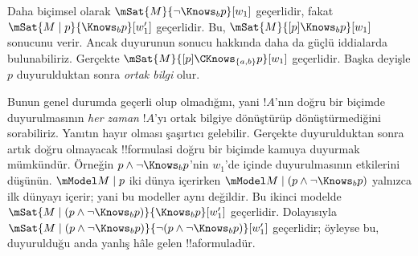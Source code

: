 Daha biçimsel olarak $\mSat{M}{\lnot \Knows_b p}[w_1]$ geçerlidir, fakat
$\mSat{M \mid p}{\Knows_b p}[w'_1]$ geçerlidir. Bu, $\mSat{M}{[p] \Knows_b
p}[w_1]$ sonucunu verir. Ancak duyurunun sonucu hakkında daha da güçlü
iddialarda bulunabiliriz. Gerçekte $\mSat{M}{[p]\CKnows_{\{a,b\}} p}[w_1]$
geçerlidir. Başka deyişle $p$ duyurulduktan sonra \emph{ortak bilgi} olur.

Bunun genel durumda geçerli olup olmadığını, yani $!A$'nın doğru bir biçimde
duyurulmasının \emph{her zaman} $!A$'yı ortak bilgiye dönüştürüp
dönüştürmediğini sorabiliriz. Yanıtın hayır olması şaşırtıcı gelebilir.
Gerçekte duyurulduktan sonra artık doğru olmayacak !!{formula}s{}i doğru bir
biçimde kamuya duyurmak mümkündür. Örneğin $p \land \lnot \Knows_b p$'nin
$w_1$'de  içinde duyurulmasının etkilerini
düşünün. $\mModel M \mid p$ iki dünya içerirken
$\mModel M \mid (p \land \lnot \Knows_b p)$ yalnızca ilk dünyayı içerir;
yani bu modeller aynı değildir. Bu ikinci modelde
$\mSat{M \mid (p \land \lnot \Knows_b p)}{\Knows_b p}[w'_1]$ geçerlidir.
Dolayısıyla
$\mSat{M \mid (p \land \lnot \Knows_b p)}{\lnot (p \land \lnot \Knows_b
p)}[w'_1]$ geçerlidir; öyleyse bu, duyurulduğu anda yanlış hâle gelen
!!a{formula}{}dür.

